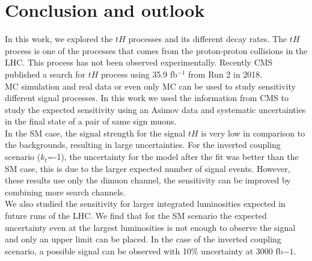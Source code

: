 

\chapter{Conclusion and outlook}
In this work, we explored the $tH$ processes and its different decay rates. 
The $tH$ process is one of the processes that comes from the proton-proton collisions in the LHC. This process has not been observed experimentally. Recently CMS published a search for $tH$ process using 35.9 fb$^{-1}$ from Run 2 in 2018. \\

MC simulation and real data or even only MC can be used to study sensitivity different signal processes. In this work we used the information from CMS to study the expected sensitivity using an Asimov data and systematic uncertainties in the final state of a pair of same sign muons. \\
In the SM case, the signal strength for the signal $tH$ is very low in comparison to
the backgrounds, resulting in large uncertainties.
For the inverted coupling scenario ($k_t$=-1), the uncertainty for the model after the fit was better than the
SM case, this is due to the larger expected number of signal events. However, these results use only the dimuon channel, the sensitivity can be improved by combining more search channels.
\\

We also studied the sensitivity for larger integrated luminosities expected in future runs of the LHC. We find that for the SM scenario the expected uncertainty even at the largest luminosities is not enough to observe the signal and only an upper limit can be placed. In the case of the inverted coupling scenario, a possible signal can be observed with 10$\%$ uncertainty at 3000 fb${-1}$.\\




